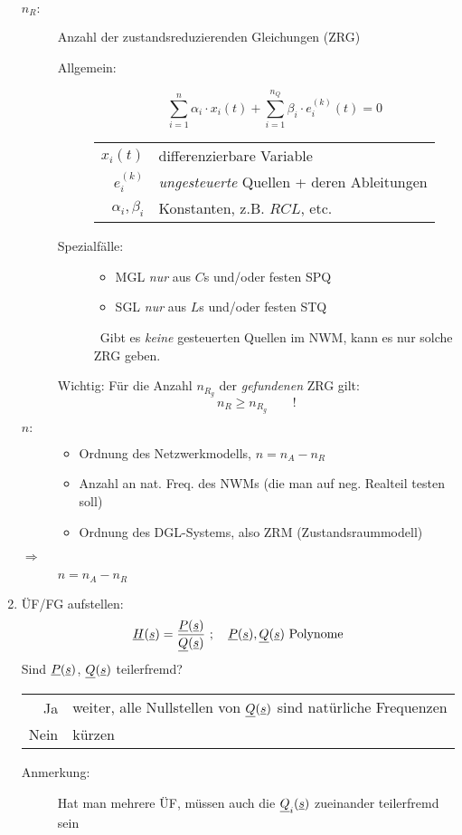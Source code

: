 \begin{enumerate}
\begin{description}
    \item[$n_R:$] Anzahl der zustandsreduzierenden Gleichungen (ZRG)
      \begin{description}
        \item[Allgemein:]
          \[\sum_{i=1}^n \alpha_i\cdot x_i(t)
            + \sum_{i=1}^{n_Q} \beta_i\cdot e_i^{(k)}(t) = 0\]
          \begin{tabular}{r@{\,:~}l}
            $x_i(t)$      &differenzierbare Variable  \\
            $e_i^{(k)}$   &\emph{ungesteuerte} Quellen + deren Ableitungen \\
            $\alpha_i, \beta_i$ &Konstanten, z.B. $RCL$, etc.
          \end{tabular}
        \item[Spezialfälle:]\hfill
          \begin{itemize}
            \item MGL \emph{nur} aus $C$s und/oder festen SPQ
            \item SGL \emph{nur} aus $L$s und/oder festen STQ
          \end{itemize}
          \leftpointright~Gibt es \emph{keine} gesteuerten Quellen im NWM,
          kann es nur solche ZRG geben.
      \end{description}
      Wichtig: Für die Anzahl $n_{R_g}$ der \emph{gefundenen} ZRG gilt:
      \[n_R \geq n_{R_g}\qquad !\]
    \item[$n:$]\hfill
      \begin{itemize}
        \item Ordnung des Netzwerkmodells, $n = n_A-n_R$
        \item Anzahl an nat. Freq. des NWMs
          (die man auf neg. Realteil testen soll)
        \item Ordnung des DGL-Systems, also ZRM (Zustandsraummodell)
      \end{itemize}
    \item[$\Rightarrow$] \colorbox{emphlight}{$n = n_A-n_R$}
  \end{description}

  \item ÜF/FG aufstellen:
    \[\underline{H}(\underline{s}) = \frac{\underline{P}(\underline{s})}{\underline{Q}(\underline{s})}\ ;\quad
      \underline{P}(\underline{s}), \underline{Q}(\underline{s})\text{ Polynome}
    \]
    Sind $\underline{P}(\underline{s})$, $\underline{Q}(\underline{s})$ teilerfremd?\\
    \begin{tabular}{@{$\rightarrow$\,}r@{\,:~\,}l@{}}
      Ja    & weiter, alle Nullstellen von $\underline{Q}(\underline{s})$ sind
        natürliche Frequenzen\\
      Nein  & kürzen
    \end{tabular}
    \begin{description}
      \item[Anmerkung:] Hat man mehrere ÜF, müssen auch die $\underline{Q}_i(\underline{s})$
        zueinander teilerfremd sein
    \end{description}


\end{enumerate}

